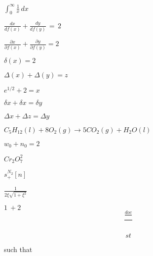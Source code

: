 \documentclass{article}
\begin{document}
$\int_0^{\infty} \frac{1}{x}\, dx$


$\frac{dx}{df(x)} + \frac{dy}{df(y)}\, =\, 2$


$\frac{\partial x}{\partial f(x)} + \frac{\partial y}{\partial f(y)} = 2$


$\delta (x) = 2$

$\Delta (x) + \Delta (y) = z$

$e^{1/2} + 2 = x$

$\delta x + \delta x = \delta y$

$\Delta x + \Delta z = \Delta y$

$C_5H_{12}(l)+8O_2(g)\rightarrow 5CO_2(g)+H_2O(l)$

$w_0 + n_0 = 2$

$Cr_2O_7^2$

$s^{N_2}_+ [n]$

$\frac{1}{2\xi \sqrt{1+\xi^2}}$

$1\: + 2$
\[
  \frac{ \frac{doc}{}}{}
\]

\[
  st
\]

such that 
\end{document}
